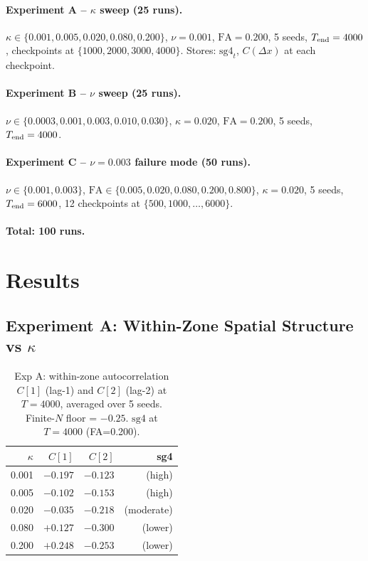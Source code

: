 \documentclass[11pt,a4paper]{article}
\begin{document}
\paragraph{Experiment A -- $\kappa$ sweep (25 runs).}
$\kappa \in \{0.001, 0.005, 0.020, 0.080, 0.200\}$, $\nu=0.001$,
$\mathrm{FA}=0.200$, 5 seeds, $T_{\rm end}=4000$, checkpoints at
$\{1000, 2000, 3000, 4000\}$.
Stores: $\mathrm{sg4}_t$, $C(\Delta x)$ at each checkpoint.

\paragraph{Experiment B -- $\nu$ sweep (25 runs).}
$\nu \in \{0.0003, 0.001, 0.003, 0.010, 0.030\}$, $\kappa=0.020$,
$\mathrm{FA}=0.200$, 5 seeds, $T_{\rm end}=4000$.

\paragraph{Experiment C -- $\nu=0.003$ failure mode (50 runs).}
$\nu \in \{0.001, 0.003\}$,
$\mathrm{FA} \in \{0.005, 0.020, 0.080, 0.200, 0.800\}$,
$\kappa=0.020$, 5 seeds, $T_{\rm end}=6000$, 12 checkpoints at $\{500, 1000, \ldots, 6000\}$.

\paragraph{Total: 100 runs.}

\section{Results}
\label{sec:results}

\subsection{Experiment A: Within-Zone Spatial Structure vs $\kappa$}

\begin{table}[h]
\centering
\caption{Exp A: within-zone autocorrelation $C[1]$ (lag-1) and $C[2]$ (lag-2) at $T=4000$,
  averaged over 5 seeds.  Finite-$N$ floor = $-0.25$.  $\mathrm{sg4}$ at $T=4000$ (FA=0.200).}
\label{tab:expA}
\begin{tabular}{r|rr|r}
\toprule
$\kappa$ & $C[1]$ & $C[2]$ & sg4 \\
\midrule
0.001 & $-0.197$ & $-0.123$ & (high) \\
0.005 & $-0.102$ & $-0.153$ & (high) \\
0.020 & $-0.035$ & $-0.218$ & (moderate) \\
0.080 & $+0.127$ & $-0.300$ & (lower) \\
0.200 & $+0.248$ & $-0.253$ & (lower) \\
\bottomrule
\end{tabular}
\end{table}
\end{document}
